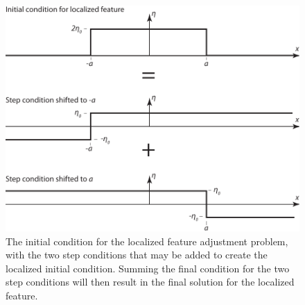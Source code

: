 \documentclass[11pt]{report}
\numberwithin{equation}{section}
\begin{document}
\begin{figure}[tb]
    \centering
    \includegraphics[width=5in]{tophat} 
    \caption{The initial condition for the localized feature adjustment problem, with the two step conditions that may be added to create the localized initial condition.  Summing the final condition for the two step conditions will then result in the final solution for the localized feature.}
    \label{fig:tophat}
\end{figure}
\end{document}
